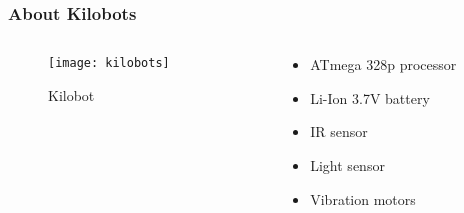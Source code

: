 \begin{frame}
	\frametitle{About Kilobots}
	\begin{columns}
		\begin{column}{0.4\textwidth}
			\begin{figure}
				\centering
				\texttt{[image: kilobots]}
				\caption{Kilobot}
			\end{figure}
		\end{column}
		
		\begin{column}{0.45\textwidth}
			\begin{itemize}
				\item ATmega 328p processor 
				\item Li-Ion 3.7V battery 
				\item IR sensor 
				\item Light sensor 
				\item Vibration motors
			\end{itemize}
		\end{column}
	\end{columns}
\end{frame}

